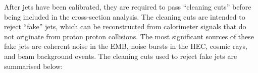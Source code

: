 
After jets have been calibrated, they are required to pass ``cleaning cuts'' before being included in the cross-section analysis. The cleaning cuts are intended to reject ``fake'' jets, which can be reconstructed from calorimeter signals that do not originate from proton proton collisions.  The most significant sources of these fake jets are coherent noise in the EMB, noise bursts in the HEC, cosmic rays, and beam background events. The cleaning cuts used to reject fake jets are summarised below:






%	
%	
%	

